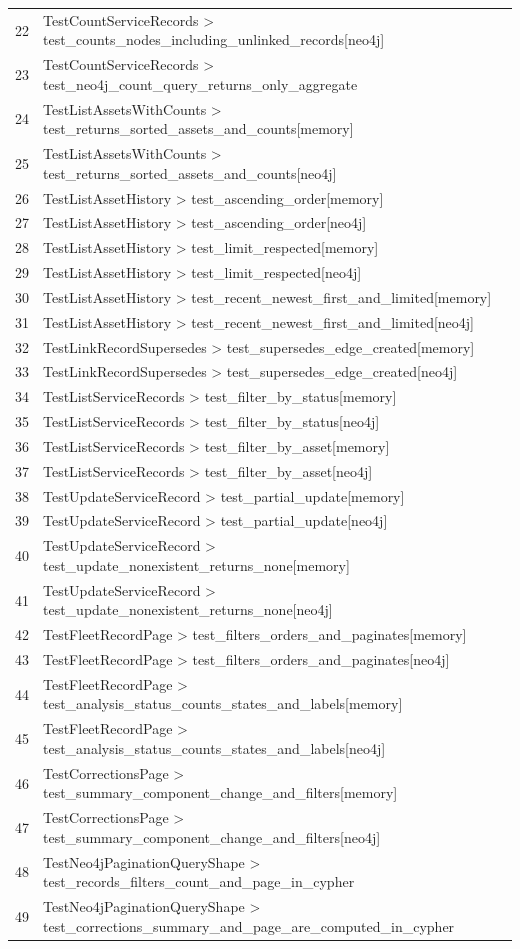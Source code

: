 \begin{longtable}{p{}p{}}
22 & TestCountServiceRecords > test\_counts\_nodes\_including\_unlinked\_records[neo4j] \\
23 & TestCountServiceRecords > test\_neo4j\_count\_query\_returns\_only\_aggregate \\
24 & TestListAssetsWithCounts > test\_returns\_sorted\_assets\_and\_counts[memory] \\
25 & TestListAssetsWithCounts > test\_returns\_sorted\_assets\_and\_counts[neo4j] \\
26 & TestListAssetHistory > test\_ascending\_order[memory] \\
27 & TestListAssetHistory > test\_ascending\_order[neo4j] \\
28 & TestListAssetHistory > test\_limit\_respected[memory] \\
29 & TestListAssetHistory > test\_limit\_respected[neo4j] \\
30 & TestListAssetHistory > test\_recent\_newest\_first\_and\_limited[memory] \\
31 & TestListAssetHistory > test\_recent\_newest\_first\_and\_limited[neo4j] \\
32 & TestLinkRecordSupersedes > test\_supersedes\_edge\_created[memory] \\
33 & TestLinkRecordSupersedes > test\_supersedes\_edge\_created[neo4j] \\
34 & TestListServiceRecords > test\_filter\_by\_status[memory] \\
35 & TestListServiceRecords > test\_filter\_by\_status[neo4j] \\
36 & TestListServiceRecords > test\_filter\_by\_asset[memory] \\
37 & TestListServiceRecords > test\_filter\_by\_asset[neo4j] \\
38 & TestUpdateServiceRecord > test\_partial\_update[memory] \\
39 & TestUpdateServiceRecord > test\_partial\_update[neo4j] \\
40 & TestUpdateServiceRecord > test\_update\_nonexistent\_returns\_none[memory] \\
41 & TestUpdateServiceRecord > test\_update\_nonexistent\_returns\_none[neo4j] \\
42 & TestFleetRecordPage > test\_filters\_orders\_and\_paginates[memory] \\
43 & TestFleetRecordPage > test\_filters\_orders\_and\_paginates[neo4j] \\
44 & TestFleetRecordPage > test\_analysis\_status\_counts\_states\_and\_labels[memory] \\
45 & TestFleetRecordPage > test\_analysis\_status\_counts\_states\_and\_labels[neo4j] \\
46 & TestCorrectionsPage > test\_summary\_component\_change\_and\_filters[memory] \\
47 & TestCorrectionsPage > test\_summary\_component\_change\_and\_filters[neo4j] \\
48 & TestNeo4jPaginationQueryShape > test\_records\_filters\_count\_and\_page\_in\_cypher \\
49 & TestNeo4jPaginationQueryShape > test\_corrections\_summary\_and\_page\_are\_computed\_in\_cypher \\
\end{longtable}
